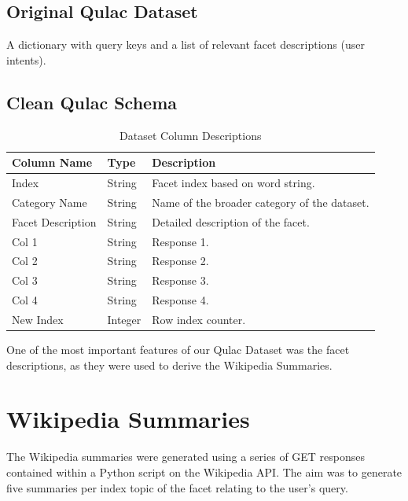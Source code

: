 \documentclass[11pt]{article}
\begin{document}
\subsection{Original Qulac Dataset}
A dictionary with query keys and a list of relevant facet descriptions (user intents).

\subsection{Clean Qulac Schema}
\renewcommand{\arraystretch}{1.2} %

\begin{table}[ht]
  \centering
  \caption{Dataset Column Descriptions}
  \label{tab:dataset-columns}
  \begin{tabular}{@{} l l p{8cm} @{}}
    \hline
    \textbf{Column Name}  & \textbf{Type}    & \textbf{Description}                               \\ 
    \hline
    Index                 & String           & Facet index based on word string.                  \\ 
    Category Name         & String           & Name of the broader category of the dataset.       \\ 
    Facet Description     & String           & Detailed description of the facet.                 \\ 
    Col 1                 & String           & Response 1.                                         \\ 
    Col 2                 & String           & Response 2.                                         \\ 
    Col 3                 & String           & Response 3.                                         \\ 
    Col 4                 & String           & Response 4.                                         \\ 
    New Index             & Integer          & Row index counter.                                 \\ 
    \hline
  \end{tabular}
\end{table}

One of the most important features of our Qulac Dataset was the facet descriptions, as they were used to derive the Wikipedia Summaries.

\section{Wikipedia Summaries}
The Wikipedia summaries were generated using a series of GET responses contained within a Python script on the Wikipedia API. The aim was to generate five summaries per index \textendash{} topic of the facet \textendash{} relating to the user's query.
\end{document}
